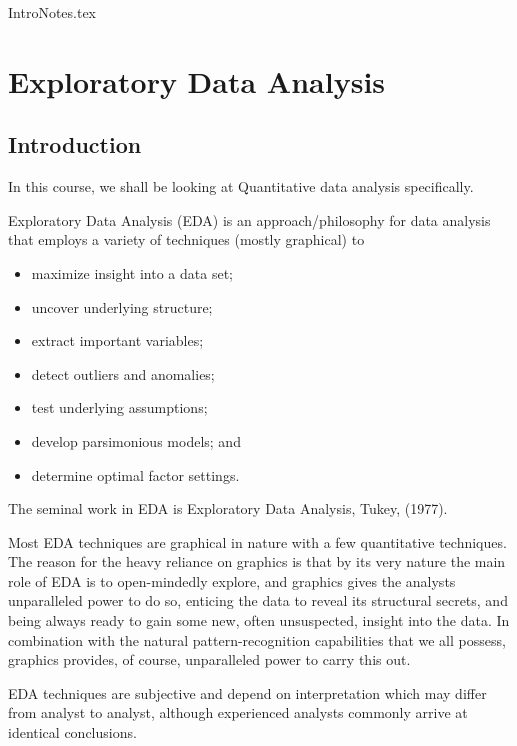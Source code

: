 IntroNotes.tex


\chapter{Exploratory Data Analysis}

\section{Introduction}
In this course, we shall be looking at Quantitative data analysis specifically.



Exploratory Data Analysis (EDA) is an approach/philosophy for data analysis that employs a variety of techniques (mostly graphical) to
\begin{itemize}
\item maximize insight into a data set;
\item uncover underlying structure;
\item extract important variables;
\item detect outliers and anomalies;
\item test underlying assumptions;
\item develop parsimonious models; and
\item determine optimal factor settings.
\end{itemize}

The seminal work in EDA is Exploratory Data Analysis, Tukey, (1977).

Most EDA techniques are graphical in nature with a few quantitative techniques. The reason for the heavy reliance on graphics is that by its very nature the main role of EDA is to open-mindedly explore, and graphics gives the analysts unparalleled power to do so, enticing the data to reveal its structural secrets, and being always ready to gain some new, often unsuspected, insight into the data. In combination with the natural pattern-recognition capabilities that we all possess, graphics provides, of course, unparalleled power to carry this out.

EDA techniques are subjective and depend on interpretation which may differ from analyst to analyst, although experienced analysts commonly arrive at identical conclusions.


